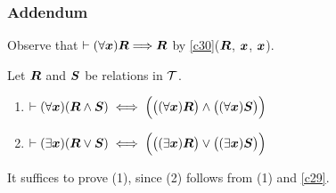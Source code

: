 \subsubsection{Addendum} Observe that $\vdash(\forall\boldsymbol{x})\boldsymbol{R}\Longrightarrow\boldsymbol{R}$
by \ref{c30}($\boldsymbol{R}$, $\boldsymbol{x}$, $\boldsymbol{x}$).

\begin{dc}\label{c32}%
Let $\boldsymbol{R}$ and $\boldsymbol{S}$ be relations in $\mathcal{T}$.
\begin{enumerate}
\item $\vdash(\forall\boldsymbol{x})(\boldsymbol{R}\land\boldsymbol{S})\iff\Bigl(\bigl((\forall\boldsymbol{x})\boldsymbol{R}\bigr)\land\bigl((\forall\boldsymbol{x})\boldsymbol{S}\bigr)\Bigr)$
\item $\vdash(\exists\boldsymbol{x})(\boldsymbol{R}\lor\boldsymbol{S})\iff\Bigl(\bigl((\exists\boldsymbol{x})\boldsymbol{R}\bigr)\lor\bigl((\exists\boldsymbol{x})\boldsymbol{S}\bigr)\Bigr)$
\end{enumerate}
\end{dc}
It suffices to prove (1), since (2) follows from (1) and \ref{c29}.
